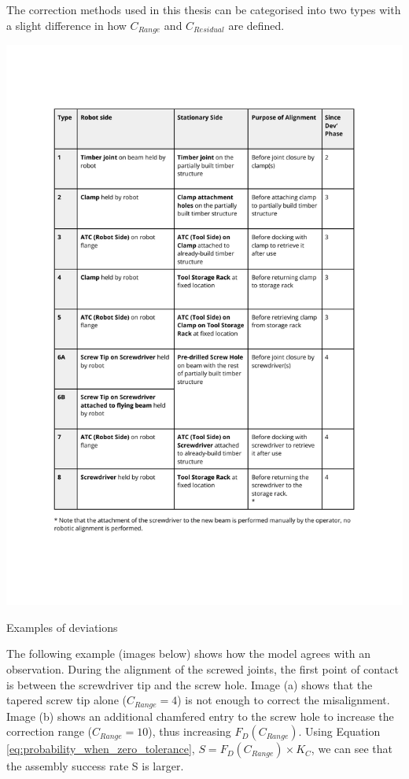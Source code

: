 The correction methods used in this thesis can be categorised into two types with a slight difference in how $C_{Range}$ and $C_{Residual}$ are defined.

\begin{table}
    \includegraphics[page=6, trim=25.4mm 160mm 25.4mm 33mm, clip, width=\textwidth]{tables/Tables in Chapter 9 to 11.pdf}
    \caption{Examples of deviations}
\end{table}

The following example (images below) shows how the model agrees with an observation. During the alignment of the screwed joints, the first point of contact is between the screwdriver tip and the screw hole. Image (a) shows that the tapered screw tip alone ($C_{Range} = 4$) is not enough to correct the misalignment. Image (b) shows an additional chamfered entry to the screw hole to increase the correction range ($C_{Range} = 10$), thus increasing $F_D(C_{Range})$. Using Equation \ref{eq:probability_when_zero_tolerance}, $S = F_{D}(C_{Range}) \times K_{C}$, we can see that the assembly success rate S is larger. 

